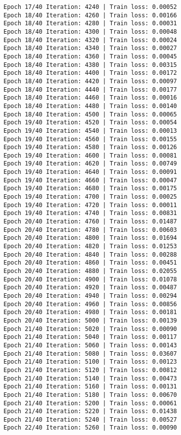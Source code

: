 \documentclass[11pt]{article}
\begin{document}
\begin{Verbatim}[commandchars=\\\{\}]
Epoch 17/40 Iteration: 4240 | Train loss: 0.00052
Epoch 18/40 Iteration: 4260 | Train loss: 0.00166
Epoch 18/40 Iteration: 4280 | Train loss: 0.00031
Epoch 18/40 Iteration: 4300 | Train loss: 0.00048
Epoch 18/40 Iteration: 4320 | Train loss: 0.00024
Epoch 18/40 Iteration: 4340 | Train loss: 0.00027
Epoch 18/40 Iteration: 4360 | Train loss: 0.00045
Epoch 18/40 Iteration: 4380 | Train loss: 0.00315
Epoch 18/40 Iteration: 4400 | Train loss: 0.00172
Epoch 18/40 Iteration: 4420 | Train loss: 0.00097
Epoch 18/40 Iteration: 4440 | Train loss: 0.00177
Epoch 18/40 Iteration: 4460 | Train loss: 0.00016
Epoch 18/40 Iteration: 4480 | Train loss: 0.00140
Epoch 18/40 Iteration: 4500 | Train loss: 0.00065
Epoch 19/40 Iteration: 4520 | Train loss: 0.00054
Epoch 19/40 Iteration: 4540 | Train loss: 0.00013
Epoch 19/40 Iteration: 4560 | Train loss: 0.00155
Epoch 19/40 Iteration: 4580 | Train loss: 0.00126
Epoch 19/40 Iteration: 4600 | Train loss: 0.00081
Epoch 19/40 Iteration: 4620 | Train loss: 0.00749
Epoch 19/40 Iteration: 4640 | Train loss: 0.00091
Epoch 19/40 Iteration: 4660 | Train loss: 0.00047
Epoch 19/40 Iteration: 4680 | Train loss: 0.00175
Epoch 19/40 Iteration: 4700 | Train loss: 0.00025
Epoch 19/40 Iteration: 4720 | Train loss: 0.00011
Epoch 19/40 Iteration: 4740 | Train loss: 0.00831
Epoch 20/40 Iteration: 4760 | Train loss: 0.01487
Epoch 20/40 Iteration: 4780 | Train loss: 0.00603
Epoch 20/40 Iteration: 4800 | Train loss: 0.01694
Epoch 20/40 Iteration: 4820 | Train loss: 0.01253
Epoch 20/40 Iteration: 4840 | Train loss: 0.00288
Epoch 20/40 Iteration: 4860 | Train loss: 0.00451
Epoch 20/40 Iteration: 4880 | Train loss: 0.02055
Epoch 20/40 Iteration: 4900 | Train loss: 0.01078
Epoch 20/40 Iteration: 4920 | Train loss: 0.00487
Epoch 20/40 Iteration: 4940 | Train loss: 0.00294
Epoch 20/40 Iteration: 4960 | Train loss: 0.00856
Epoch 20/40 Iteration: 4980 | Train loss: 0.00181
Epoch 20/40 Iteration: 5000 | Train loss: 0.00139
Epoch 21/40 Iteration: 5020 | Train loss: 0.00090
Epoch 21/40 Iteration: 5040 | Train loss: 0.00117
Epoch 21/40 Iteration: 5060 | Train loss: 0.00143
Epoch 21/40 Iteration: 5080 | Train loss: 0.03607
Epoch 21/40 Iteration: 5100 | Train loss: 0.00123
Epoch 21/40 Iteration: 5120 | Train loss: 0.00812
Epoch 21/40 Iteration: 5140 | Train loss: 0.00473
Epoch 21/40 Iteration: 5160 | Train loss: 0.00131
Epoch 21/40 Iteration: 5180 | Train loss: 0.00670
Epoch 21/40 Iteration: 5200 | Train loss: 0.00061
Epoch 21/40 Iteration: 5220 | Train loss: 0.01438
Epoch 21/40 Iteration: 5240 | Train loss: 0.00527
Epoch 22/40 Iteration: 5260 | Train loss: 0.00090

\end{Verbatim}
\end{document}
